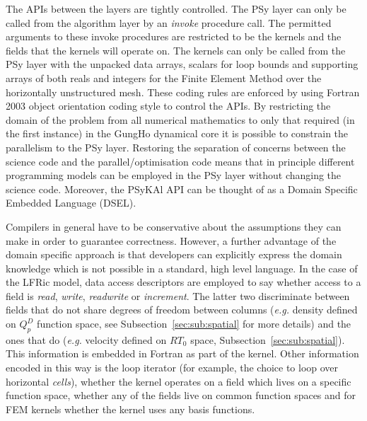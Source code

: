 \documentclass[review,times]{elsarticle}
\begin{document}
The APIs between the layers are tightly controlled. The PSy layer can
only be called from the algorithm layer by an {\em invoke} procedure
call. The permitted arguments to these invoke procedures are restricted
to be the kernels and the fields that the kernels will operate on. The
kernels can only be called from the PSy layer with the unpacked data
arrays, scalars for loop bounds and supporting arrays of both reals
and integers for the Finite Element Method over the horizontally unstructured mesh.
These coding rules are enforced by using Fortran 2003 object
orientation coding style to control the APIs. By restricting the
domain of the problem from all numerical mathematics to only that
required (in the first instance) in the GungHo dynamical core it is
possible to constrain the parallelism to the PSy layer. Restoring
the separation of concerns between the science code and the
parallel/optimisation code means that in principle different programming
models can be employed in the PSy layer without changing the science
code. Moreover, the PSyKAl API can be thought of as a Domain Specific
Embedded Language (DSEL).

Compilers in general have to be conservative about the assumptions
they can make in order to guarantee correctness. However, a further
advantage of the domain specific approach is that developers can
explicitly express the domain knowledge which is not possible in a
standard, high level language. In the case of the LFRic model, data
access descriptors are employed to say whether access to a field is
{\em read}, {\em write}, {\em readwrite} or {\em increment}. The latter 
two discriminate between fields that do not share degrees 
of freedom between columns ({\em e.g.} density defined on 
$Q_p^D$ function space, see Subsection~\ref{sec:sub:spatial} for more details) 
and the ones that do ({\em e.g.} velocity defined on $RT_0$ space, 
Subsection~\ref{sec:sub:spatial}). This information is embedded in
Fortran as part of the kernel. Other information encoded in this way
is the loop iterator (for example, the choice to loop over horizontal {\em cells}), whether the kernel
operates on a field which lives on a specific function space, whether
any of the fields live on common function spaces and for FEM kernels
whether the kernel uses any basis functions. 
\end{document}
